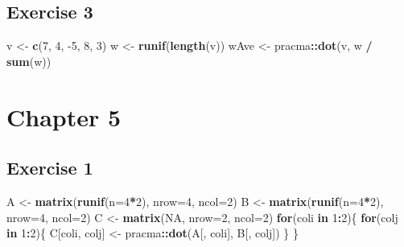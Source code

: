 \documentclass[
]{book}
\newenvironment{Shaded}{\begin{snugshade}}{\end{snugshade}}
\newcommand{\ControlFlowTok}[1]{\textcolor[rgb]{0.13,0.29,0.53}{\textbf{#1}}}
\newcommand{\DataTypeTok}[1]{\textcolor[rgb]{0.13,0.29,0.53}{#1}}
\newcommand{\DecValTok}[1]{\textcolor[rgb]{0.00,0.00,0.81}{#1}}
\newcommand{\KeywordTok}[1]{\textcolor[rgb]{0.13,0.29,0.53}{\textbf{#1}}}
\newcommand{\NormalTok}[1]{#1}
\newcommand{\OperatorTok}[1]{\textcolor[rgb]{0.81,0.36,0.00}{\textbf{#1}}}
\newcommand{\OtherTok}[1]{\textcolor[rgb]{0.56,0.35,0.01}{#1}}
\newcommand{\StringTok}[1]{\textcolor[rgb]{0.31,0.60,0.02}{#1}}
\begin{document}
\hypertarget{exercise-3}{%
\subsection*{Exercise 3}\label{exercise-3}}

\begin{Shaded}
\begin{Highlighting}[]
\NormalTok{v \textless{}{-}}\StringTok{ }\KeywordTok{c}\NormalTok{(}\DecValTok{7}\NormalTok{, }\DecValTok{4}\NormalTok{, }\DecValTok{{-}5}\NormalTok{, }\DecValTok{8}\NormalTok{, }\DecValTok{3}\NormalTok{)}
\NormalTok{w \textless{}{-}}\StringTok{ }\KeywordTok{runif}\NormalTok{(}\KeywordTok{length}\NormalTok{(v))}
\NormalTok{wAve \textless{}{-}}\StringTok{ }\NormalTok{pracma}\OperatorTok{::}\KeywordTok{dot}\NormalTok{(v, w }\OperatorTok{/}\StringTok{ }\KeywordTok{sum}\NormalTok{(w))}
\end{Highlighting}
\end{Shaded}

\hypertarget{chapter-5-1}{%
\section*{Chapter 5}\label{chapter-5-1}}

\hypertarget{exercise-1-1}{%
\subsection*{Exercise 1}\label{exercise-1-1}}

\begin{Shaded}
\begin{Highlighting}[]
\NormalTok{A \textless{}{-}}\StringTok{ }\KeywordTok{matrix}\NormalTok{(}\KeywordTok{runif}\NormalTok{(}\DataTypeTok{n=}\DecValTok{4}\OperatorTok{*}\DecValTok{2}\NormalTok{), }\DataTypeTok{nrow=}\DecValTok{4}\NormalTok{, }\DataTypeTok{ncol=}\DecValTok{2}\NormalTok{)}
\NormalTok{B \textless{}{-}}\StringTok{ }\KeywordTok{matrix}\NormalTok{(}\KeywordTok{runif}\NormalTok{(}\DataTypeTok{n=}\DecValTok{4}\OperatorTok{*}\DecValTok{2}\NormalTok{), }\DataTypeTok{nrow=}\DecValTok{4}\NormalTok{, }\DataTypeTok{ncol=}\DecValTok{2}\NormalTok{)}
\NormalTok{C \textless{}{-}}\StringTok{ }\KeywordTok{matrix}\NormalTok{(}\OtherTok{NA}\NormalTok{, }\DataTypeTok{nrow=}\DecValTok{2}\NormalTok{, }\DataTypeTok{ncol=}\DecValTok{2}\NormalTok{)}
\ControlFlowTok{for}\NormalTok{(coli }\ControlFlowTok{in} \DecValTok{1}\OperatorTok{:}\DecValTok{2}\NormalTok{)\{}
  \ControlFlowTok{for}\NormalTok{(colj }\ControlFlowTok{in} \DecValTok{1}\OperatorTok{:}\DecValTok{2}\NormalTok{)\{}
\NormalTok{    C[coli, colj] \textless{}{-}}\StringTok{ }\NormalTok{pracma}\OperatorTok{::}\KeywordTok{dot}\NormalTok{(A[, coli], B[, colj])}
\NormalTok{  \}}
\NormalTok{\}}
\end{Highlighting}
\end{Shaded}
\end{document}
